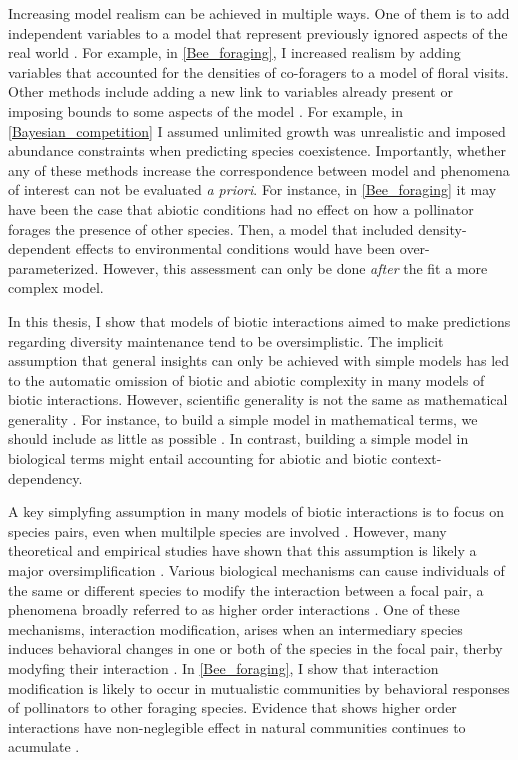 \begin{refsection}
Increasing model realism can be achieved in multiple ways. One of them is to add independent variables to a model that represent previously ignored aspects of the real world \citep{orzack1993critical, evans2013simple}. For example, in \autoref{Bee_foraging}, I increased realism by adding variables that accounted for the densities of co-foragers to a model of floral visits. Other methods include adding a new link to variables already present or imposing bounds to some aspects of the model \citep{levins1993response}. For example, in \autoref{Bayesian_competition} I assumed unlimited growth was unrealistic and imposed abundance constraints when predicting species coexistence. Importantly, whether any of these methods increase the correspondence between model and phenomena of interest can not be evaluated \textit{a priori}. For instance, in  \autoref{Bee_foraging} it may have been the case that abiotic conditions had no effect on how a pollinator forages the presence of other species. Then, a model that included density-dependent effects to environmental conditions would have been over-parameterized. However, this assessment can only be done \textit{after} the fit a more complex model.


In this thesis, I show that models of biotic interactions aimed to make predictions regarding diversity maintenance tend to be oversimplistic. The implicit assumption that general insights can only be achieved with simple models \citep{holling1966strategy,may2019stability,roughgarden2018adaptive} has led to the automatic omission of biotic and abiotic complexity in many models of biotic interactions. However, scientific generality is not the same as mathematical generality \citep{levins1993response}.  For instance, to build a simple model in mathematical terms, we should include as little as possible \citep{orzack2012philosophy}. In contrast, building a simple model in biological terms might entail accounting for abiotic and biotic context-dependency.

A key simplyfing assumption in many models of biotic interactions is to focus on species pairs, even when multilple species are involved \citep{levine_beyond_2017}. However, many theoretical and empirical studies have shown that this assumption is likely a major oversimplification \citep{abrams1983arguments,billick_higher_1994,mayfield2017higher,letten_mechanistic_2019}. Various  biological mechanisms can cause individuals of the same or different species to modify the interaction between a focal pair, a phenomena broadly referred to as higher order interactions \citep{kleinhesselink2019mechanisms}. One of these mechanisms, interaction modification, arises when an intermediary species induces behavioral changes in one or both of the species in the focal pair, therby modyfing their interaction \citep{adler_general_1994, billick_higher_1994}. In \autoref{Bee_foraging}, I show that interaction modification is likely to occur in mutualistic communities by behavioral responses of pollinators to other foraging species. Evidence that shows higher order interactions have non-neglegible effect in natural communities continues to acumulate \citep{mayfield2017higher,martyn2021identifying,lai2020role,levine_beyond_2017}.



\end{refsection}
